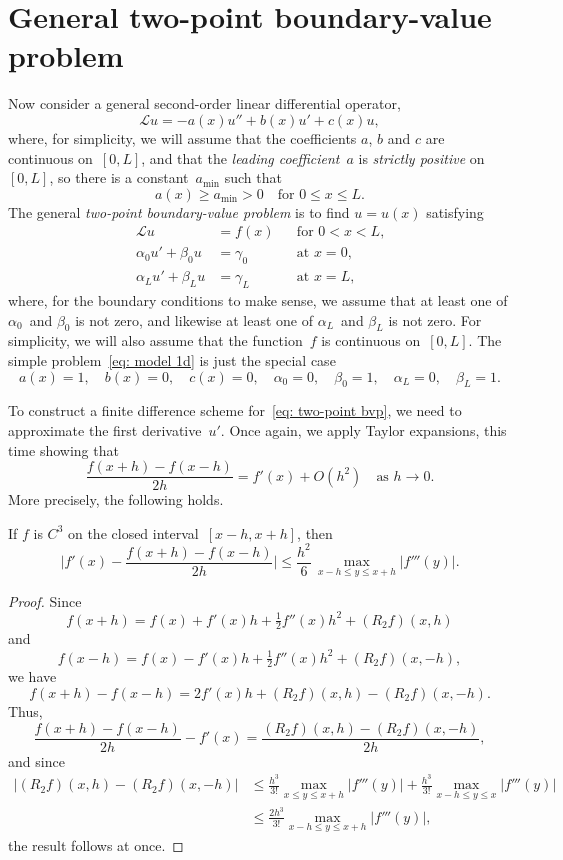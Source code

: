 \section{General two-point boundary-value problem}
\label{sec: gen two-point bvp}

Now consider a general second-order linear differential operator,
\[
\mathcal{L}u=-a(x)u''+b(x)u'+c(x)u,
\]
where, for simplicity, we will assume that the coefficients $a$, $b$ and 
$c$ are continuous on~$[0,L]$, and that the \emph{leading coefficient}~$a$ is 
\emph{strictly positive} on~$[0,L]$, so there is a constant~$a_{\min}$ such that
\begin{equation}\label{eq: ellipticity 1d}
a(x)\ge a_{\min}>0\quad\text{for $0\le x\le L$.}
\end{equation}
The general \emph{two-point boundary-value problem} is to find $u=u(x)$ 
satisfying
\begin{equation}\label{eq: two-point bvp}
\begin{aligned}
\mathcal{L}u&=f(x)&&\text{for $0<x<L$,}\\
\alpha_0u'+\beta_0u&=\gamma_0&&\text{at $x=0$,}\\
\alpha_Lu'+\beta_Lu&=\gamma_L&&\text{at $x=L$,}
\end{aligned}
\end{equation}
where, for the boundary conditions to make sense, we assume that at least one 
of $\alpha_0$~and $\beta_0$ is not zero, and likewise at least one of  
$\alpha_L$~and $\beta_L$ is not zero.  For simplicity, we will also assume that 
the function~$f$ is continuous on~$[0,L]$.  The simple 
problem~\eqref{eq: model 1d} is just the special case
\[
a(x)=1,\quad b(x)=0,\quad 
c(x)=0,\quad\alpha_0=0,\quad\beta_0=1,\quad\alpha_L=0,\quad\beta_L=1.
\]

To construct a finite difference scheme for~\eqref{eq: two-point bvp}, we need 
to approximate the first derivative~$u'$.  Once again, we apply Taylor 
expansions, this time showing that
\[
\frac{f(x+h)-f(x-h)}{2h}=f'(x)+O(h^2)\quad\text{as $h\to0$.}
\]
More precisely, the following holds.

\begin{theorem}\label{thm: first central diff}
If $f$ is $C^3$ on the closed interval~$[x-h,x+h]$, then
\[
\biggl|f'(x)-\frac{f(x+h)-f(x-h)}{2h}\biggr|
	\le\frac{h^2}{6}\,\max_{x-h\le y\le x+h}|f'''(y)|.
\]
\end{theorem}
\begin{proof}
Since
\[
f(x+h)=f(x)+f'(x)h+\tfrac12f''(x)h^2+(R_2f)(x,h)
\]
and
\[
f(x-h)=f(x)-f'(x)h+\tfrac12f''(x)h^2+(R_2f)(x,-h),
\]
we have
\[
f(x+h)-f(x-h)=2f'(x)h+(R_2f)(x,h)-(R_2f)(x,-h).
\]
Thus,
\[
\frac{f(x+h)-f(x-h)}{2h}-f'(x)=\frac{(R_2f)(x,h)-(R_2f)(x,-h)}{2h},
\]
and since
\begin{align*}
\bigl|(R_2f)(x,h)-(R_2f)(x,-h)\bigr|
	&\le\frac{h^3}{3!}\max_{x\le y\le x+h}|f'''(y)|
 	   +\frac{h^3}{3!}\max_{x-h\le y\le x}|f'''(y)|\\
	&\le\frac{2h^3}{3!}\max_{x-h\le y\le x+h}|f'''(y)|,
\end{align*}
the result follows at once.
\end{proof}

